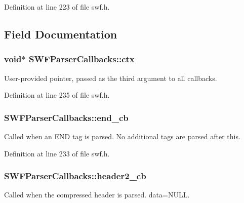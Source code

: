 Definition at line 223 of file swf.\-h.



\subsection{Field Documentation}
\hypertarget{struct_s_w_f_parser_callbacks_a580259560295835647b2ac312addaf9c}{
\subsubsection[{ctx}]{\setlength{\rightskip}{0pt plus 5cm}void$\ast$ S\-W\-F\-Parser\-Callbacks\-::ctx}}\label{struct_s_w_f_parser_callbacks_a580259560295835647b2ac312addaf9c}
User-\/provided pointer, passed as the third argument to all callbacks. 

Definition at line 235 of file swf.\-h.

\hypertarget{struct_s_w_f_parser_callbacks_a31cb75f39add22bb824685d6d7ba07a1}{
\subsubsection[{end\-\_\-cb}]{ S\-W\-F\-Parser\-Callbacks\-::end\-\_\-cb}}\label{struct_s_w_f_parser_callbacks_a31cb75f39add22bb824685d6d7ba07a1}
Called when an E\-N\-D tag is parsed. No additional tags are parsed after this. 

Definition at line 233 of file swf.\-h.

\hypertarget{struct_s_w_f_parser_callbacks_a21beaa520990137cfe64ee20d5eb6054}{
\subsubsection[{header2\-\_\-cb}]{ S\-W\-F\-Parser\-Callbacks\-::header2\-\_\-cb}}\label{struct_s_w_f_parser_callbacks_a21beaa520990137cfe64ee20d5eb6054}


Called when the compressed header is parsed. data=N\-U\-L\-L. 



